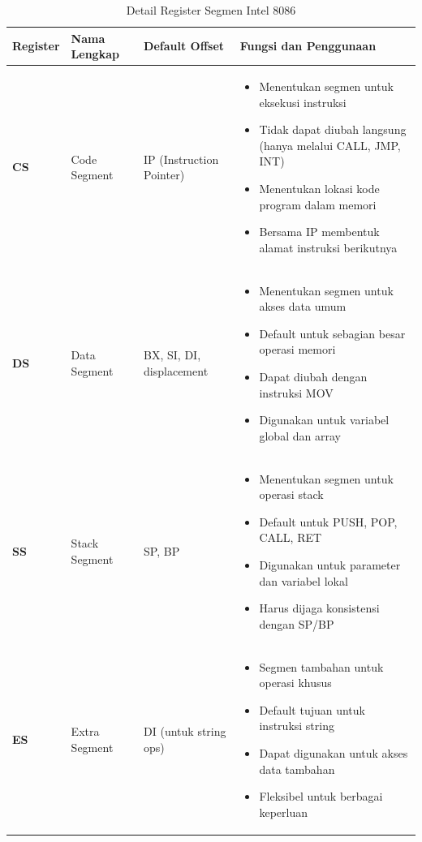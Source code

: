 \documentclass[../main.tex]{subfiles}
\begin{document}
\begin{table}[h]
\centering
\caption{Detail Register Segmen Intel 8086}
\begin{tabular}{|p{2cm}|p{3cm}|p{4cm}|p{6cm}|}
\hline
\textbf{Register} & \textbf{Nama Lengkap} & \textbf{Default Offset} & \textbf{Fungsi dan Penggunaan} \\
\hline
\textbf{CS} & Code Segment & IP (Instruction Pointer) & \begin{itemize}
\item Menentukan segmen untuk eksekusi instruksi
\item Tidak dapat diubah langsung (hanya melalui CALL, JMP, INT)
\item Menentukan lokasi kode program dalam memori
\item Bersama IP membentuk alamat instruksi berikutnya
\end{itemize} \\
\hline
\textbf{DS} & Data Segment & BX, SI, DI, displacement & \begin{itemize}
\item Menentukan segmen untuk akses data umum
\item Default untuk sebagian besar operasi memori
\item Dapat diubah dengan instruksi MOV
\item Digunakan untuk variabel global dan array
\end{itemize} \\
\hline
\textbf{SS} & Stack Segment & SP, BP & \begin{itemize}
\item Menentukan segmen untuk operasi stack
\item Default untuk PUSH, POP, CALL, RET
\item Digunakan untuk parameter dan variabel lokal
\item Harus dijaga konsistensi dengan SP/BP
\end{itemize} \\
\hline
\textbf{ES} & Extra Segment & DI (untuk string ops) & \begin{itemize}
\item Segmen tambahan untuk operasi khusus
\item Default tujuan untuk instruksi string
\item Dapat digunakan untuk akses data tambahan
\item Fleksibel untuk berbagai keperluan
\end{itemize} \\
\hline
\end{tabular}
\label{tab:segment-registers-detail}
\end{table}
\end{document}
